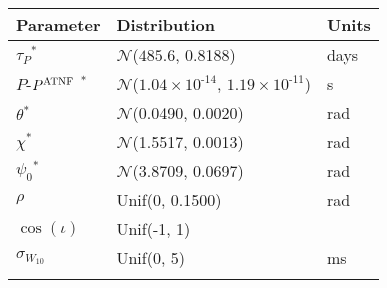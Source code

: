 \begin{tabular}{lll} \hhline{===}
        Parameter & Distribution &  Units\\ \hline
$\tau_{P}$$^{*}$ & $\mathcal{N}$($485.6$, 0.8188) & days\\
$P$\textrm{-}$P^{\tiny\textrm{ATNF}}$
$^{*}$ & $\mathcal{N}$(${1.04}\times 10^{\textrm{-}14}$, ${1.19}\times 10^{\textrm{-}11}$) & s\\
$\theta$$^{*}$ & $\mathcal{N}$(0.0490, 0.0020) & rad\\
$\chi$$^{*}$ & $\mathcal{N}$(1.5517, 0.0013) & rad\\
$\psi_0$$^{*}$ & $\mathcal{N}$(3.8709, 0.0697) & rad\\
$\rho$$^{}$ & Unif(0, 0.1500) & rad\\
$\cos(\iota)$$^{}$ & Unif(\textrm{-}1, 1) & \\
$\sigma_{W_{10}}$$^{}$ & Unif(0, 5) & ms\\
\hhline{===}
\end{tabular}